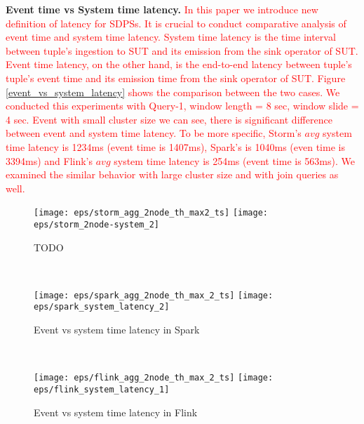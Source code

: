 {\begin{figure*}
        \caption{CPU and Network usage of systems in a 4-node cluster. Colors indicate nodes in a cluster}
        \label{fig_cpu_network_metrics}
\end{figure*}



\textbf{Event time vs System time latency.}
\textcolor{red}{In this paper we introduce new definition of latency for SDPSs. It is crucial to conduct comparative analysis of event time and system time latency. System time latency is the time interval between tuple's ingestion to SUT and its emission from the sink operator of SUT. Event time latency, on the other hand, is the end-to-end latency between tuple's tuple's event time and its emission time from the sink operator of SUT. Figure \ref{event_vs_system_latency} shows the comparison between the two cases. We conducted this experiments with Query-1, window length = 8 sec, window slide = 4 sec. Event with small cluster size  we can see, there is significant difference between event and system time latency. To be more specific, Storm's $avg$ system time latency is 1234ms (event time is 1407ms), Spark's is 1040ms (even time is 3394ms) and Flink's $avg$ system time latency is 254ms (event time is 563ms). We examined the similar behavior with large cluster size and with join queries as well. }




\begin{figure*}
	\centering
	
	\begin{subfigure}[b]{0.3\textwidth}
		\texttt{[image: eps/storm\_agg\_2node\_th\_max2\_ts]}
		\texttt{[image: eps/storm\_2node-system\_2]}
		
		\caption{TODO }
	\end{subfigure}
	~ 
	\begin{subfigure}[b]{0.3\textwidth}
		\texttt{[image: eps/spark\_agg\_2node\_th\_max\_2\_ts]}
		\texttt{[image: eps/spark\_system\_latency\_2]}
		
		\caption{Event  vs system  time latency in Spark }
	\end{subfigure}
	~ 
	\begin{subfigure}[b]{0.3\textwidth}
		\texttt{[image: eps/flink\_agg\_2node\_th\_max\_2\_ts]}
		\texttt{[image: eps/flink\_system\_latency\_1]}
		
		\caption{Event vs system time latency in Flink }
	\end{subfigure}
	

\end{figure*}}
